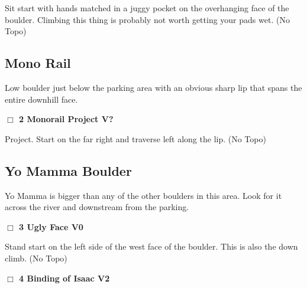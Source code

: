 \begin{multicols}{2}
\begin{adjustwidth}{1.3em}{}
Sit start with hands matched in a juggy pocket on the overhanging face of the boulder. Climbing this thing is probably not worth getting your pads wet.
  (No Topo)
\end{adjustwidth}





\needspace{3em}
\subsection*{Mono Rail}\label{bf:Mono Rail}

Low boulder just below the parking area with an obvious sharp lip that spans the entire downhill face.\\



\needspace{2em}
\label{rt:Monorail Project}
\colorbox{black!20}{
\parbox{0.95\linewidth}{
\hspace{-1ex}\textbf{$\Box$
2 Monorail Project V?  
}}}
\begin{adjustwidth}{1.3em}{}			

Project. Start on the far right and traverse left along the lip.
  (No Topo)
\end{adjustwidth}





\needspace{3em}
\subsection*{Yo Mamma Boulder}\label{bf:Yo Mamma Boulder}

Yo Mamma is bigger than any of the other boulders in this area. Look for it across the river and downstream from the parking.\\



\needspace{2em}
\label{rt:Ugly Face}
\colorbox{green!20}{
\parbox{0.95\linewidth}{
\hspace{-1ex}\textbf{$\Box$
3 Ugly Face V0  \warn
}}}
\begin{adjustwidth}{1.3em}{}			

Stand start on the left side of the west face of the boulder. This is also the down climb.
  (No Topo)
\end{adjustwidth}




\needspace{2em}
\label{rt:Binding of Isaac}
\colorbox{green!20}{
\parbox{0.95\linewidth}{
\hspace{-1ex}\textbf{$\Box$
4 Binding of Isaac V2  \warn
}}}
\begin{adjustwidth}{1.3em}{}			


\end{adjustwidth}
\end{multicols}
